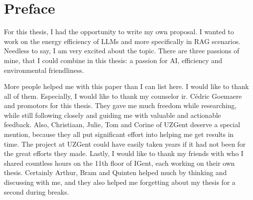 
\titleformat{\chapter}{}{}{0em}{\bf\Huge}
\chapter*{Preface}

For this thesis, I had the opportunity to write my own proposal. I wanted to work on the energy efficiency of LLMs and more specifically in RAG scenarios. Needless to say, I am very excited about the topic. There are three passions of mine, that I could combine in this thesis: a passion for AI, efficiency and environmental friendliness. 


More people helped me with this paper than I can list here. I would like to thank all of them. Especially, I would like to thank my counselor ir. Cédric Goemaere and promotors for this thesis. They gave me much freedom while researching, while still following closely and guiding me with valuable and actionable feedback. Also, Christiaan, Julie, Tom and Corine of UZGent deserve a special mention, because they all put significant effort into helping me get results in time. The project at UZGent could have easily taken years if it had not been for the great efforts they made. Lastly, I would like to thank my friends with who I shared countless hours on the 11th floor of IGent, each working on their own thesis. Certainly Arthur, Bram and Quinten helped much by thinking and discussing with me, and they also helped me forgetting about my thesis for a second during breaks.